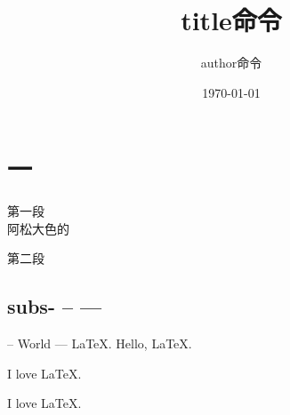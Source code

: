 \documentclass[11pt]{article}
\def\HL{Hello, \LaTeX.\xspace}
\def\WhoLove#1{#1 love \LaTeX.}
\def\WLW#1#2{#1 love #2.}
\begin{document}
    \title{title命令}
    \author{author命令}
    \date{\today}
    \maketitle


    \section{一}
    第一段\\阿松大色的

    第二段

    \subsection{subs- -- ---}

    -- World --- LaTeX.
    \HL

    \WhoLove{I}

    \WLW{I}{\LaTeX}
\end{document}
